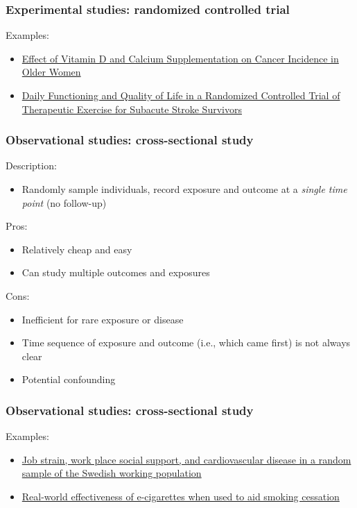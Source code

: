 \documentclass[12pt, 
hyperref={colorlinks=true, linkcolor=blue, urlcolor=cyan}]{beamer}
\begin{document}
\begin{frame}
\frametitle{Experimental studies: randomized controlled trial}
Examples:
\begin{itemize}
\item \href{https://jamanetwork.com/journals/jama/article-abstract/2613159}{Effect of Vitamin D and Calcium Supplementation on Cancer Incidence in Older Women}
\item \href{http://stroke.ahajournals.org/content/36/8/1764.short}{Daily Functioning and Quality of Life in a Randomized Controlled Trial of Therapeutic Exercise for Subacute Stroke Survivors}
\end{itemize}
\end{frame}

\begin{frame}
\frametitle{Observational studies: cross-sectional study}
Description: \vspace{-0.3cm}
\begin{itemize}
\item Randomly sample individuals, record exposure and outcome at a \textit{single time point} (no follow-up) %
\end{itemize}

Pros:\vspace{-0.3cm}
\begin{itemize}
\item Relatively cheap and easy
\item Can study multiple outcomes and exposures
\end{itemize}

Cons:\vspace{-0.3cm}
\begin{itemize}
\item Inefficient for rare exposure or disease %
\item Time sequence of exposure and outcome (i.e., which came first) is not always clear %
\item Potential confounding
\end{itemize}
\end{frame}

\begin{frame}
\frametitle{Observational studies: cross-sectional study}
Examples:
\begin{itemize}
\item \href{http://ajph.aphapublications.org/doi/abs/10.2105/AJPH.78.10.1336}{Job strain, work place social support, and cardiovascular disease in a random sample of the Swedish working population}
\item \href{onlinelibrary.wiley.com/doi/10.1111/add.12623/full}{Real-world effectiveness of e-cigarettes when used to aid smoking cessation}
\end{itemize}
\end{frame}
\end{document}
